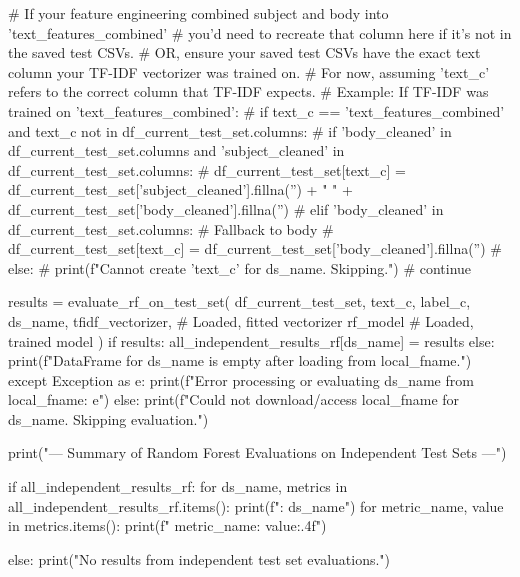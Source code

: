 \begin{ffcode}
                    # If your feature engineering combined subject and body into 'text_features_combined'
                    # you'd need to recreate that column here if it's not in the saved test CSVs.
                    # OR, ensure your saved test CSVs have the exact text column your TF-IDF vectorizer was trained on.
                    # For now, assuming 'text_c' refers to the correct column that TF-IDF expects.
                    # Example: If TF-IDF was trained on 'text_features_combined':
                    # if text_c == 'text_features_combined' and text_c not in df_current_test_set.columns:
                    #    if 'body_cleaned' in df_current_test_set.columns and 'subject_cleaned' in df_current_test_set.columns:
                    #        df_current_test_set[text_c] = df_current_test_set['subject_cleaned'].fillna('') + " " + df_current_test_set['body_cleaned'].fillna('')
                    #    elif 'body_cleaned' in df_current_test_set.columns: # Fallback to body
                    #        df_current_test_set[text_c] = df_current_test_set['body_cleaned'].fillna('')
                    #    else:
                    #        print(f"Cannot create '{text_c}' for {ds_name}. Skipping.")
                    #        continue

                    results = evaluate_rf_on_test_set(
                        df_current_test_set,
                        text_c,
                        label_c,
                        ds_name,
                        tfidf_vectorizer, # Loaded, fitted vectorizer
                        rf_model          # Loaded, trained model
                    )
                    if results:
                        all_independent_results_rf[ds_name] = results
                else:
                    print(f"DataFrame for {ds_name} is empty after loading from {local_fname}.")
            except Exception as e:
                print(f"Error processing or evaluating {ds_name} from {local_fname}: {e}")
        else:
            print(f"Could not download/access {local_fname} for {ds_name}. Skipping evaluation.")

print("\n\n--- Summary of Random Forest Evaluations on Independent Test Sets ---")

if all_independent_results_rf:
    for ds_name, metrics in all_independent_results_rf.items():
        print(f"\nDataset: {ds_name}")
        for metric_name, value in metrics.items():
            print(f"  {metric_name}: {value:.4f}")

else:
    print("No results from independent test set evaluations.")
\end{ffcode}